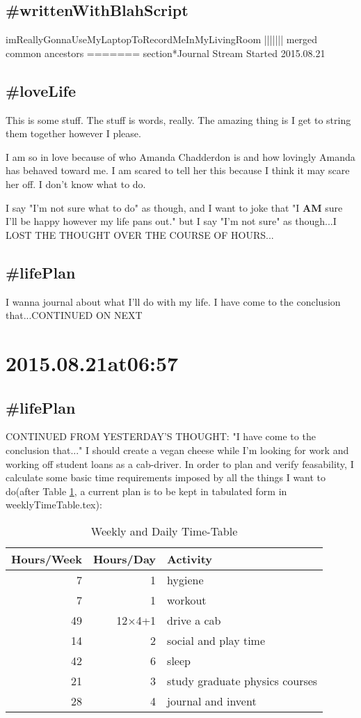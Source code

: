 \subsection*{\#writtenWithBlahScript }
imReallyGonnaUseMyLaptopToRecordMeInMyLivingRoom
||||||| merged common ancestors
=======
section*{Journal Stream Started 2015.08.21}

\subsection*{\#loveLife}
This is some stuff. The stuff is words, really. The amazing thing is I get to string them together however I please.

I am so in love because of who Amanda Chadderdon is and how lovingly Amanda has behaved toward me. I am scared to tell her this because I think it may scare her off. I don't know what to do.

I say "I'm not sure what to do" as though, and I want to joke that "I \textbf{AM} sure I'll be happy however my life pans out." but I say "I'm not sure" as though...I LOST THE THOUGHT OVER THE COURSE OF HOURS...

\subsection*{\#lifePlan}
I wanna journal about what I'll do with my life. I have come to the conclusion that...CONTINUED ON NEXT

\section*{2015.08.21at06:57}
\subsection*{\#lifePlan} CONTINUED FROM YESTERDAY'S THOUGHT:
"I have come to the conclusion that..." I should create a vegan cheese while I'm looking for work and working off student loans as a cab-driver.
In order to plan and verify feasability, I calculate some basic time requirements imposed by all the things I want to do(after Table \ref{tab:originalWeeklyAndDailyTimeTableCopy}, a current plan is to be kept in tabulated form in weeklyTimeTable.tex):

\begin{table}
\caption{\label{tab:originalWeeklyAndDailyTimeTableCopy}Weekly and Daily Time-Table}
\begin{tabular}{|r|r|l|}
\hline
Hours/Week&Hours/Day&Activity\\
\hline
7&1&hygiene\\
7&1&workout\\
49&12$\times$4+1&drive a cab\\
14&2&social and play time\\
42&6&sleep\\
21&3&study graduate physics courses\\
28&4&journal and invent\\
\hline
\end{tabular}\end{table}

